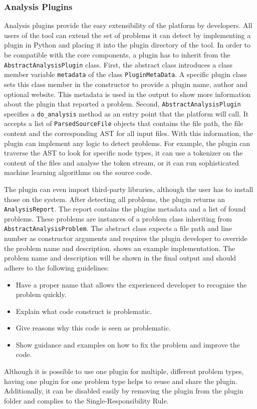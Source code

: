 \subsubsection{Analysis Plugins}\label{sec:analysis_plugins}
Analysis plugins provide the easy extensibility of the platform by developers. All users of the tool can extend the set of problems it can detect by implementing a plugin in Python and placing it into the plugin directory of the tool. In order to be compatible with the core components, a plugin has to inherit from the \texttt{AbstractAnalysisPlugin} class. First, the abstract class introduces a class member variable \texttt{metadata} of the class \texttt{PluginMetaData}. A specific plugin class sets this class member in the constructor to provide a plugin name, author and optional website. This metadata is used in the output to show more information about the plugin that reported a problem. Second, \texttt{AbstractAnalysisPlugin} specifies a \texttt{do\_analysis} method as an entry point that the platform will call. It accepts a list of \texttt{ParsedSourceFile} objects that contains the file path, the file content and the corresponding AST for all input files. With this information, the plugin can implement any logic to detect problems. 
For example, the plugin can traverse the AST to look for specific node types, it can use a tokenizer on the content of the files and analyse the token stream, or it can run sophisticated machine learning algorithms on the source code.

The plugin can even import third-party libraries, although the user has to install those on the system. After detecting all problems, the plugin returns an \texttt{AnalysisReport}. The report contains the plugins metadata and a list of found problems. 
These problems are instances of a problem class inheriting from \texttt{AbstractAnalysis\-Problem}. The abstract class expects a file path and line number as constructor arguments and requires the plugin developer to override the problem name and description.  shows an example implementation. The problem name and description will be shown in the final output and should adhere to the following guidelines:

\begin{itemize}
    \item Have a proper name that allows the experienced developer to recognise the problem quickly.
    \item Explain what code construct is problematic.
    \item Give reasons why this code is seen as problematic.
    \item Show guidance and examples on how to fix the problem and improve the code.
\end{itemize}
Although it is possible to use one plugin for multiple, different problem types, having one plugin for one problem type helps to reuse and share the plugin. Additionally, it can be disabled easily by removing the plugin from the plugin folder and complies to the Single-Responsibility Rule.



